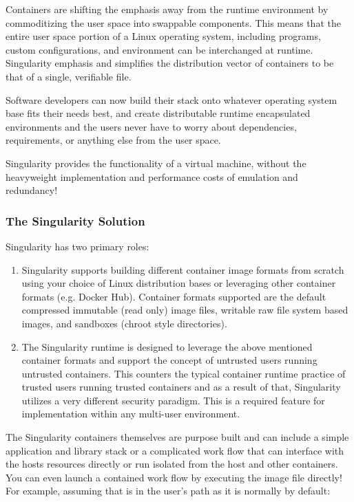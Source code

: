 \documentclass[letterpaper,10pt,english]{sphinxmanual}
\begin{document}
Containers are shifting the emphasis away from the runtime environment by commoditizing the user space into swappable components. This means that the entire user space portion of a Linux operating system, including programs, custom configurations, and environment can be interchanged at runtime. Singularity emphasis and simplifies the distribution vector of containers to be that of a single, verifiable file.

Software developers can now build their stack onto whatever operating system base fits their needs best, and create distributable runtime encapsulated environments and the users never have to worry about dependencies, requirements, or anything else from the user space.

Singularity provides the functionality of a virtual machine, without the heavyweight implementation and performance costs of emulation and redundancy!


\subsubsection{The Singularity Solution}
\label{\detokenize{introduction:the-singularity-solution}}
Singularity has two primary roles:
\begin{enumerate}
\item {} 
 Singularity supports building different container image formats from scratch using your choice of Linux distribution bases or leveraging other container formats (e.g. Docker Hub). Container formats supported are the default compressed immutable (read only) image files, writable raw file system based images, and sandboxes (chroot style directories).

\item {} 
 The Singularity runtime is designed to leverage the above mentioned container formats and support the concept of untrusted users running untrusted containers. This counters the typical container runtime practice of trusted users running trusted containers and as a result of that, Singularity utilizes a very different security paradigm. This is a required feature for implementation within any multi-user environment.

\end{enumerate}

The Singularity containers themselves are purpose built and can include a simple application and library stack or a complicated work flow that can interface with the hosts resources directly or run isolated from the host and other containers. You can even launch a contained work flow by executing the image file directly! For example, assuming that  is in the user’s path as it is normally by default:
\end{document}
